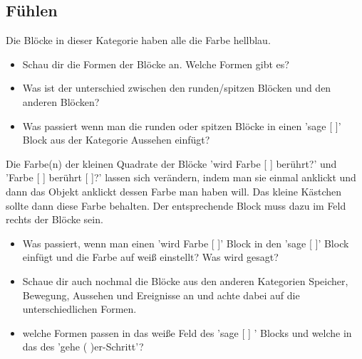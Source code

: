 \documentclass{\VorlagenPfad/coderdojokatext}
\begin{document}
\subsection{Fühlen}
Die Blöcke in dieser Kategorie haben alle die \textcolor{Fue}{Farbe hellblau}. 
\begin{itemize}
\item Schau dir die Formen der Blöcke an. Welche Formen gibt es?
\item Was ist der unterschied zwischen den runden/spitzen Blöcken und den anderen Blöcken?
\item Was passiert wenn man die runden oder spitzen Blöcke in einen \textcolor{Aus}{'sage [  ]'} Block aus der Kategorie \textcolor{Aus}{Aussehen} einfügt?
\end{itemize}
Die Farbe(n) der kleinen Quadrate der Blöcke \textcolor{Fue}{'wird Farbe [  ] berührt?'} und \textcolor{Fue}{'Farbe [  ] berührt [  ]?'} lassen sich verändern, indem man sie einmal anklickt und dann das Objekt anklickt dessen Farbe man haben will. Das kleine Kästchen sollte dann diese Farbe behalten. Der entsprechende Block muss dazu im Feld rechts der Blöcke sein.
\begin{itemize}
\item Was passiert, wenn man einen \textcolor{Fue}{'wird Farbe [  ]'} Block in den \textcolor{Aus}{'sage [  ]'} Block einfügt und die Farbe auf weiß einstellt? Was wird gesagt?
\item Schaue dir auch nochmal die Blöcke aus den anderen Kategorien \textcolor{Spe}{Speicher}, \textcolor{Bew}{Bewegung}, \textcolor{Aus}{Aussehen} und \textcolor{Ere}{Ereignisse} an und achte dabei auf die unterschiedlichen Formen.
\item welche Formen passen in das weiße Feld des \textcolor{Aus}{'sage [  ] '} Blocks und welche in das des \textcolor{Bew}{'gehe ( )er-Schritt'}?
\end{itemize} 
\end{document}
